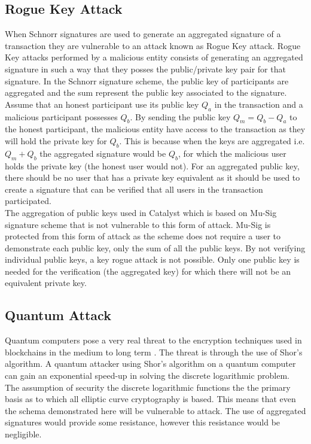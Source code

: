 \subsection{Rogue Key Attack}

When Schnorr signatures are used to generate an aggregated signature of a transaction they are vulnerable to an attack known as Rogue Key attack. Rogue Key attacks performed by a malicious entity consists of generating an aggregated signature in such a way that they posses the public/private key pair for that signature. In the Schnorr signature scheme, the public key of participants are aggregated and the sum represent the public key associated to the signature. Assume that an honest participant use its public key $Q_a$ in the transaction and a malicious participant possesses $Q_b$. By sending the public key $Q_m = Q_b - Q_a$ to the honest participant, the malicious entity have access to the transaction as they will hold the private key for $Q_b$. This is because when the keys are aggregated i.e. $Q_m + Q_b$ the aggregated signature would be $Q_b$, for which the malicious user holds the private key (the honest user would not). For an aggregated public key, there should be no user that has a private key equivalent as it should be used to create a signature that can be verified that all users in the transaction participated. \\ 	

The aggregation of public keys used in Catalyst which is based on Mu-Sig \cite{musig} signature scheme that is not vulnerable to this form of attack. Mu-Sig is protected from this form of attack as the scheme does not require a user to demonstrate each public key, only the sum of all the public keys. By not verifying individual public keys, a key rogue attack is not possible. Only one public key is needed for the verification (the aggregated key) for which there will not be an equivalent private key.

\subsection{Quantum Attack}

Quantum computers pose a very real threat to the encryption techniques used in blockchains in the medium to long term \cite{agarwal}. The threat is through the use of Shor's algorithm. A quantum attacker using Shor's algorithm on a quantum computer can gain an exponential speed-up in solving the discrete logarithmic problem. The assumption of security the discrete logarithmic functions the the primary basis as to which all elliptic curve cryptography is based. This means that even the schema demonstrated here will be vulnerable to attack. The use of aggregated signatures would provide some resistance, however this resistance would be negligible. \\

